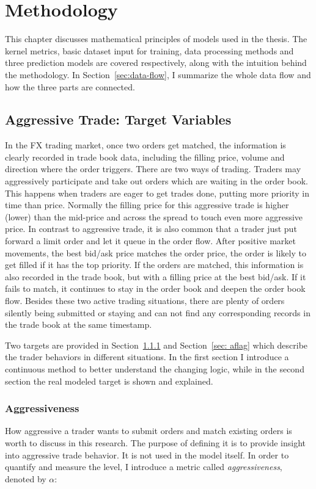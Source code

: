 \chapter{Methodology}\label{chapter:methodology}


This chapter discusses mathematical principles of models used in the thesis. The kernel metrics, basic dataset input for training, data processing methods and three prediction models are covered respectively, along with the intuition behind the methodology. In Section~\ref{sec:data-flow}, I summarize the whole data flow and how the three parts are connected. 

\section{Aggressive Trade: Target Variables}
In the FX trading market, once two orders get matched, the information is clearly recorded in trade book data, including the filling price, volume and direction where the order triggers. There are two ways of trading. Traders may aggressively participate and take out orders which are waiting in the order book. This happens when traders are eager to get trades done, putting more priority in time than price. Normally the filling price for this aggressive trade is higher (lower) than the mid-price and across the spread to touch even more aggressive price. In contrast to aggressive trade, it is also common that a trader just put forward a limit order and let it queue in the order flow. After positive market movements, the best bid/ask price matches the order price, the order is likely to get filled if it has the top priority. If the orders are matched, this information is also recorded in the trade book, but with a filling price at the best bid/ask. If it fails to match, it continues to stay in the order book and deepen the order book flow. Besides these two active trading situations, there are plenty of orders silently being submitted or staying and can not find any corresponding records in the trade book at the same timestamp. 

Two targets are provided in Section~\ref{sec: alpha} and Section~\ref{sec: aflag} which describe the trader behaviors in different situations. In the first section I introduce a continuous method to better understand the changing logic, while in the second section the real modeled target is shown and explained.

\subsection{Aggressiveness} \label{sec: alpha}
How aggressive a trader wants to submit orders and match existing orders is worth to discuss in this research. The purpose of defining it is to provide insight into aggressive trade behavior. It is not used in the model itself. In order to quantify and measure the level, I introduce a metric called \textit{aggressiveness}, denoted by $\alpha$:

